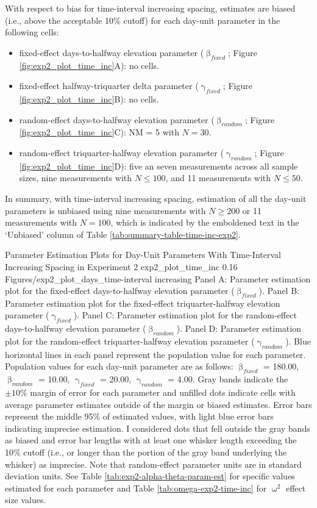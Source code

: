 \documentclass[
12pt, %
twoside,
english]{guelphthesis}
\theoremstyle{definition}
\theoremstyle{definition}
\theoremstyle{definition}
\theoremstyle{definition}
\theoremstyle{remark}
\begin{document}
With respect to bias for time-interval increasing spacing, estimates are biased (i.e., above the acceptable 10\% cutoff) for each day-unit parameter in the following cells:
\begin{itemize}
\tightlist
\item
  fixed-effect days-to-halfway elevation parameter (\(\upbeta_{fixed}\); Figure \ref{fig:exp2_plot_time_inc}A): no cells.
\item
  fixed-effect halfway-triquarter delta parameter (\(\upgamma_{fixed}\); Figure \ref{fig:exp2_plot_time_inc}B): no cells.
\item
  random-effect days-to-halfway elevation parameter (\(\upbeta_{random}\); Figure \ref{fig:exp2_plot_time_inc}C): NM = 5 with \(N = 30\).\\
\item
  random-effect triquarter-halfway elevation parameter (\(\upgamma_{random}\); Figure \ref{fig:exp2_plot_time_inc}D): five an seven measurements across all sample sizes, nine measurements with \(N \le 100\), and 11 measurements with \(N \le 50\).
\end{itemize}
In summary, with time-interval increasing spacing, estimation of all the day-unit parameters is unbiased using nine measurements with \(N \ge 200\) or 11 measurements with \(N = 100\), which is indicated by the emboldened text in the `Unbiased' column of Table \ref{tab:summary-table-time-inc-exp2}.
\begin{apaFigure}
[portrait]
[samepage]
[-0.2cm]
{Parameter Estimation Plots for Day-Unit Parameters With Time-Interval Increasing Spacing in Experiment 2}
{exp2_plot_time_inc}
{0.16}
{Figures/exp2_plot_days_time-interval increasing}
{Panel A: Parameter estimation plot for the fixed-effect days-to-halfway elevation parameter ($\upbeta_{fixed}$). Panel B: Parameter estimation plot for the fixed-effect triquarter-halfway elevation parameter ($\upgamma_{fixed}$). Panel C: Parameter estimation plot for the random-effect days-to-halfway elevation parameter ($\upbeta_{random}$). Panel D: Parameter estimation plot for the random-effect triquarter-halfway elevation parameter ($\upgamma_{random}$). Blue horizontal lines in each panel represent the population value for each parameter. Population values for each day-unit parameter are as follows: $\upbeta_{fixed}$ = 180.00, $\upbeta_{random}$ = 10.00, $\upgamma_{fixed}$ = 20.00, $\upgamma_{random}$ = 4.00. Gray bands indicate the $\pm 10\%$ margin of error for each parameter and unfilled dots indicate cells with average parameter estimates outside of the margin or biased estimates. Error bars represent the middle 95\% of estimated values, with light blue error bars indicating imprecise estimation. I considered dots that fell outside the gray bands as biased and error bar lengths with at least one whisker length exceeding the 10\% cutoff (i.e., or longer than the portion of the gray band underlying the whisker) as imprecise. Note that random-effect parameter units are in standard deviation units. See Table \ref{tab:exp2-alpha-theta-param-est} for specific values estimated for each parameter and Table \ref{tab:omega-exp2-time-inc} for $\upomega^2$ effect size values.}
\end{apaFigure}
\end{document}
